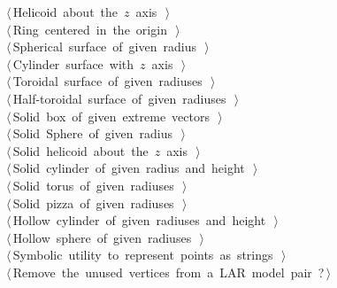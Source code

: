 \documentclass[11pt,oneside]{article}	%
\begin{document}
\begin{flushleft}
\begin{list}{}{}
\mbox{}\verb@@\hbox{$\langle\,$Helicoid about the $z$ axis\nobreak\ {\footnotesize {}}$\,\rangle$}\verb@@\\
\mbox{}\verb@@\hbox{$\langle\,$Ring centered in the origin\nobreak\ {\footnotesize {}}$\,\rangle$}\verb@@\\
\mbox{}\verb@@\hbox{$\langle\,$Spherical surface of given radius\nobreak\ {\footnotesize {}}$\,\rangle$}\verb@@\\
\mbox{}\verb@@\hbox{$\langle\,$Cylinder surface with $z$ axis\nobreak\ {\footnotesize {}}$\,\rangle$}\verb@@\\
\mbox{}\verb@@\hbox{$\langle\,$Toroidal surface of given radiuses\nobreak\ {\footnotesize {}}$\,\rangle$}\verb@@\\
\mbox{}\verb@@\hbox{$\langle\,$Half-toroidal surface of given radiuses\nobreak\ {\footnotesize {}}$\,\rangle$}\verb@@\\
\mbox{}\verb@@\hbox{$\langle\,$Solid box of given extreme vectors\nobreak\ {\footnotesize {}}$\,\rangle$}\verb@@\\
\mbox{}\verb@@\hbox{$\langle\,$Solid Sphere of given radius\nobreak\ {\footnotesize {}}$\,\rangle$}\verb@@\\
\mbox{}\verb@@\hbox{$\langle\,$Solid helicoid about the $z$ axis\nobreak\ {\footnotesize {}}$\,\rangle$}\verb@@\\
\mbox{}\verb@@\hbox{$\langle\,$Solid cylinder of given radius and height\nobreak\ {\footnotesize {}}$\,\rangle$}\verb@@\\
\mbox{}\verb@@\hbox{$\langle\,$Solid torus of given radiuses\nobreak\ {\footnotesize {}}$\,\rangle$}\verb@@\\
\mbox{}\verb@@\hbox{$\langle\,$Solid pizza of given radiuses\nobreak\ {\footnotesize {}}$\,\rangle$}\verb@@\\
\mbox{}\verb@@\hbox{$\langle\,$Hollow cylinder of given radiuses and height\nobreak\ {\footnotesize {}}$\,\rangle$}\verb@@\\
\mbox{}\verb@@\hbox{$\langle\,$Hollow sphere of given radiuses\nobreak\ {\footnotesize {}}$\,\rangle$}\verb@@\\
\mbox{}\verb@@\hbox{$\langle\,$Symbolic utility to represent points as strings\nobreak\ {\footnotesize {}}$\,\rangle$}\verb@@\\
\mbox{}\verb@@\hbox{$\langle\,$Remove the unused vertices from a LAR model pair\nobreak\ {\footnotesize ?}$\,\rangle$}\verb@@\\
\mbox{}\verb@@{\NWsep}
\end{list}
\vspace{-2ex}
\end{flushleft}
\end{document}
